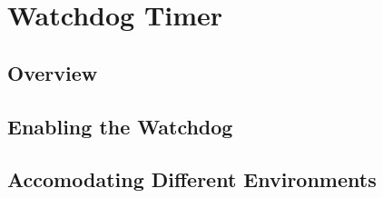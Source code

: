 \chapter{Watchdog Timer}

\section{Overview}

\section{Enabling the Watchdog}

\section{Accomodating Different Environments}
